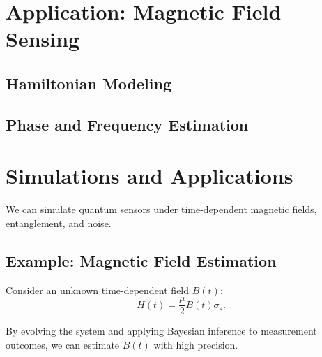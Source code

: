 \chapter{Application: Magnetic Field Sensing}
\section{Hamiltonian Modeling}
\section{Phase and Frequency Estimation}
\chapter{Simulations and Applications}

We can simulate quantum sensors under time-dependent magnetic fields, entanglement, and noise.

\section{Example: Magnetic Field Estimation}

Consider an unknown time-dependent field $B(t)$:
\[
H(t) = \frac{\mu}{2} B(t) \sigma_z.
\]

By evolving the system and applying Bayesian inference to measurement
outcomes, we can estimate $B(t)$ with high precision.
